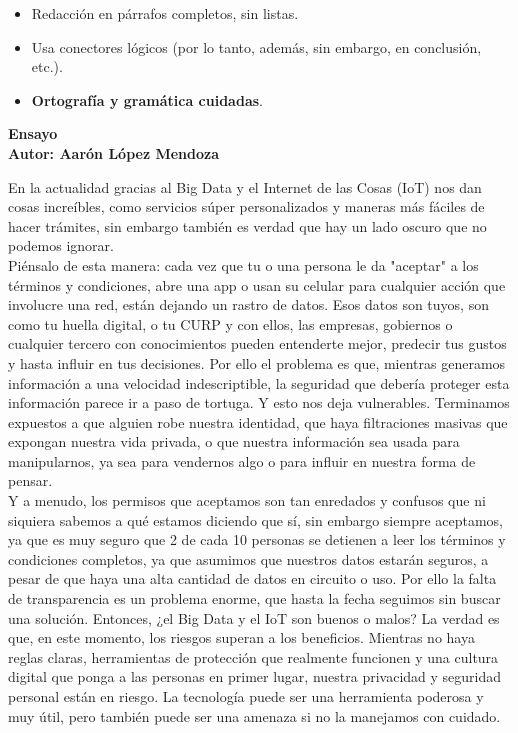 \documentclass[12pt]{report}
\begin{document}
\begin{enumerate}[label=\textbf{\arabic*.}, leftmargin=*]
\begin{enumerate}[label=\textbf{\alph*.}, leftmargin=*, itemsep=1.0em]
\begin{itemize}
\begin{itemize}
\begin{itemize}
      \item Redacci\'on en p\'arrafos completos, sin listas.
      \item Usa conectores l\'ogicos (por lo tanto, adem\'as, sin embargo, en conclusi\'on, etc.).
      \item \textbf{Ortograf\'ia y gram\'atica cuidadas}.
    \end{itemize}
  \end{itemize}
\end{itemize}
\newpage
\textbf{Ensayo\\
        Autor: Aar\'on L\'opez Mendoza}


En la actualidad gracias al Big Data y el Internet de las Cosas (IoT) nos dan cosas increíbles, como servicios súper personalizados y maneras más fáciles de hacer trámites, sin embargo también es verdad que hay un lado oscuro que no podemos ignorar.\\
Piénsalo de esta manera: cada vez que tu o una persona le da "aceptar" a los términos y condiciones, abre una app o usan su celular para cualquier acción que involucre una red, están dejando un rastro de datos. Esos datos son tuyos, son como tu huella digital, o tu CURP y con ellos, las empresas, gobiernos o cualquier tercero con conocimientos pueden entenderte mejor, predecir tus gustos y hasta influir en tus decisiones.
Por ello el problema es que, mientras generamos información a una velocidad indescriptible, la seguridad que debería proteger esta información parece ir a paso de tortuga. Y esto nos deja vulnerables. Terminamos expuestos a que alguien robe nuestra identidad, que haya filtraciones masivas que expongan nuestra vida privada, o que nuestra información sea usada para manipularnos, ya sea para vendernos algo o para influir en nuestra forma de pensar.\\

Y a menudo, los permisos que aceptamos son tan enredados y confusos que ni siquiera sabemos a qué estamos diciendo que sí, sin embargo siempre aceptamos, ya que es muy seguro que 2 de cada 10 personas se detienen a leer los términos y condiciones completos, ya que asumimos que nuestros datos estarán seguros, a pesar de que haya una alta cantidad de datos en circuito o uso. Por ello la falta de transparencia es un problema enorme, que hasta la fecha seguimos sin buscar una solución.
Entonces, ¿el Big Data y el IoT son buenos o malos? La verdad es que, en este momento, los riesgos superan a los beneficios. Mientras no haya reglas claras, herramientas de protección que realmente funcionen y una cultura digital que ponga a las personas en primer lugar, nuestra privacidad y seguridad personal están en riesgo. La tecnología puede ser una herramienta poderosa y muy útil, pero también puede ser una amenaza si no la manejamos con cuidado.\\


\end{enumerate}
\end{enumerate}
\end{document}
